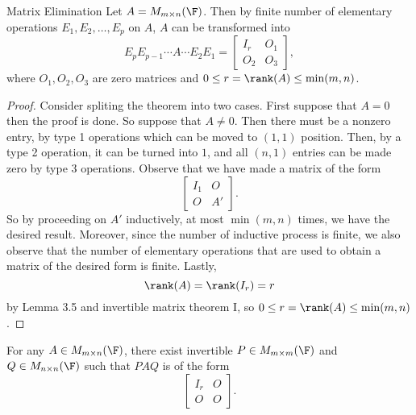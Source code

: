 \documentclass[linearalgebraI]{subfiles}
\begin{document}
    \begin{theorem}{Matrix Elimination}
            Let $A=M_{m\times n}(\F)$. Then by finite number of elementary operations $E_1, E_2, \ldots, E_p$ on $A$, $A$ can be transformed into
            \begin{equation*}
                E_pE_{p-1}\cdots A\cdots E_2E_1 = \begin{bmatrix} I_r & O_1 \\ O_2 & O_3 \end{bmatrix}, 
            \end{equation*}
            where $O_1, O_2, O_3$ are zero matrices and $0\leq r = \rank(A) \leq \min(m,n)$.
    \end{theorem}

    \begin{proof}
        Consider spliting the theorem into two cases. First suppose that $A=0$ then the proof is done. So suppose that $A\neq 0$. Then there must be a nonzero entry, by type 1 operations which can be moved to $(1,1)$ position. Then, by a type 2 operation, it can be turned into $1$, and all $(n,1)$ entries can be made zero by type 3 operations. Observe that we have made a matrix of the form
        \begin{equation*}
            \begin{bmatrix} I_1 & O \\ O & A' \end{bmatrix}.
        \end{equation*}
        So by proceeding on $A'$ inductively, at most $\min(m, n)$ times, we have the desired result. Moreover, since the number of inductive process is finite, we also observe that the number of elementary operations that are used to obtain a matrix of the desired form is finite. Lastly,
        \begin{equation*}
            \rank(A) = \rank(I_r) = r 
        \end{equation*}
        by Lemma 3.5 and invertible matrix theorem I, so $0\leq r = \rank(A) \leq \min(m, n)$.
    \end{proof}

    \begin{cor}{}
        For any $A\in M_{m\times n}(\F)$, there exist invertible $P\in M_{m\times m}(\F)$ and $Q\in M_{n\times n}(\F)$ such that $PAQ$ is of the form
        \begin{equation*}
            \begin{bmatrix}
                I_r & O \\ O & O
            \end{bmatrix}.
        \end{equation*}
    \end{cor}	
\end{document}
